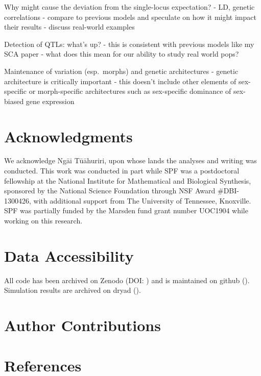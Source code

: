 \documentclass[
  11pt,
]{article}
\begin{document}
Why might cause the deviation from the single-locus expectation? - LD,
genetic correlations - compare to previous models and speculate on how
it might impact their results - discuss real-world examples

Detection of QTLs: what's up? - this is consistent with previous models
like my SCA paper - what does this mean for our ability to study real
world pops?

Maintenance of variation (esp.~morphs) and genetic architectures -
genetic architecture is critically important - this doesn't include
other elements of sex-specific or morph-specific architectures such as
sex-specific dominance of sex-biased gene expression

\hypertarget{acknowledgments}{%
\section{Acknowledgments}\label{acknowledgments}}

We acknowledge Ngāi Tūāhuriri, upon whose lands the analyses and writing
was conducted. This work was conducted in part while SPF was a
postdoctoral fellowship at the National Institute for Mathematical and
Biological Synthesis, sponsored by the National Science Foundation
through NSF Award \#DBI-1300426, with additional support from The
University of Tennessee, Knoxville. SPF was partially funded by the
Marsden fund grant number UOC1904 while working on this research.

\hypertarget{data-accessibility}{%
\section{Data Accessibility}\label{data-accessibility}}

All code has been archived on Zenodo (DOI: ) and is maintained on github
(). Simulation results are archived on dryad ().

\hypertarget{author-contributions}{%
\section{Author Contributions}\label{author-contributions}}

\hypertarget{references}{%
\section*{References}\label{references}}
\end{document}
